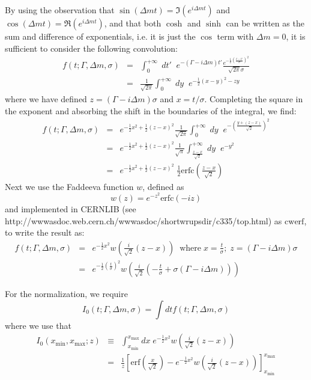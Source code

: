 \documentclass[a4paper,10pt,twosided]{article}
\begin{document}
By using the observation that $\sin(\Delta m t) = \Im\left( e^{i\Delta m t}\right)$ and $\cos(\Delta m t ) = \Re\left( e^{ i \Delta m t } \right)$, and that both $\cosh$ and $\sinh$ can
be written as the sum and difference of exponentials, i.e. it is just the $\cos$ term with $\Delta m = 0$, it is sufficient to consider the following convolution:
\begin{eqnarray*}
f(t;\Gamma,\Delta m,\sigma) &=& \int_0^{+\infty}\;dt'\;\; e^{-(\Gamma -i \Delta m)t'} \frac{ e^{-\frac{1}{2}\left( \frac{t-t'}{\sigma} \right)^2}}{\sqrt{2\pi}\sigma}
\\                          &=& \frac{1}{\sqrt{2\pi}} \int_0^{+\infty}\;dy \;\;  e^{-\frac{1}{2}\left( x-y \right)^2-zy}
\end{eqnarray*}
where we have defined $z = (\Gamma - i \Delta m ) \sigma$ and $x = t / \sigma$.
Completing the square in the exponent and absorbing the shift in the boundaries of the integral, we find:
\begin{eqnarray*}
f(t;\Gamma,\Delta m,\sigma) &=& e^{-\frac{1}{2}x^2+\frac{1}{2}(z-x)^2}  \frac{1}{\sqrt{2\pi}} \int_0^{+\infty}\;dy \;\; e^{-\left(\frac{ y+(z-x)}{\sqrt{2}} \right)^2}
\\                          &=&  e^{-\frac{1}{2}x^2+\frac{1}{2}(z-x)^2}  \frac{1}{\sqrt{\pi}} \int_{\frac{z-x}{\sqrt{2}}}^{+\infty}\;dy \;\; e^{-y^2 }
\\                          &=&  e^{-\frac{1}{2}x^2+\frac{1}{2}(z-x)^2}  \; \frac{1}{2}\mathrm{erfc}\left(\frac{z-x}{\sqrt{2}} \right)
\end{eqnarray*}
Next we use the Faddeeva function $w$,  defined as 
\begin{equation}
    w(z) = e^{-z^2}\mathrm{erfc}\left(-iz\right)
\end{equation}
and implemented in CERNLIB (see http://wwwasdoc.web.cern.ch/wwwasdoc/shortwrupsdir/c335/top.html) as $\mathrm{cwerf}$, to write the result as:
\begin{eqnarray*}
f(t;\Gamma,\Delta m,\sigma) &=&  e^{-\frac{1}{2}x^2} w\left( \frac{i}{\sqrt{2}} \left( z-x\right) \right)\;\; \mathrm{where} \; x=\frac{t}{\sigma};\; z = \left(\Gamma-i\Delta m\right)\sigma
\\   &=& e^{-\frac{1}{2}\left(\frac{t}{\sigma}\right)^2} w\left( \frac{i}{\sqrt{2}} \left( -\frac{t}{\sigma} + \sigma\left(\Gamma-i\Delta m \right) \right)  \right)
\end{eqnarray*}


For the normalization, we require
\begin{equation*}
    I_0(t;\Gamma,\Delta m,\sigma)  = \int dt f(t;\Gamma,\Delta m, \sigma) 
\end{equation*}
where we use that
\begin{eqnarray*}
   I_0(x_\mathrm{min},x_\mathrm{max};z) &\equiv& \int_{x_\mathrm{min}}^{x_\mathrm{max}} dx\; e^{-\frac{1}{2}x^2} w\left( \frac{i}{\sqrt{2}}(z-x) \right) 
\\             &=&\frac{1}{z}\left[ \mathrm{erf}\left(\frac{x}{\sqrt{2}} \right) -e^{-\frac{1}{2}x^2} w\left( \frac{i}{\sqrt{2}}\left(z-x\right) \right) \right]_{x_\mathrm{min}}^{x_\mathrm{max}}
\end{eqnarray*}
\end{document}
